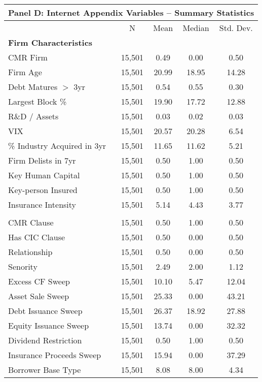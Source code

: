 {
\def\sym#1{\ifmmode^{#1}\else\(^{#1}\)\fi}
\begin{tabular}{l*{1}{cccc}}
\toprule
\multicolumn{5}{c}{\small \centering \textbf{Panel D}: Internet Appendix Variables -- Summary Statistics}\\ \midrule                    &           N&        Mean&      Median&   Std. Dev.\\
\midrule
\multicolumn{5}{l}{\textbf{Firm Characteristics}} \\ CMR Firm            &      15,501&        0.49&        0.00&        0.50\\
Firm Age            &      15,501&       20.99&       18.95&       14.28\\
Debt Matures $ > $ 3yr&      15,501&        0.54&        0.55&        0.30\\
Largest Block \%    &      15,501&       19.90&       17.72&       12.88\\
R\&D / Assets       &      15,501&        0.03&        0.02&        0.03\\
VIX                 &      15,501&       20.57&       20.28&        6.54\\
\% Industry Acquired in 3yr&      15,501&       11.65&       11.62&        5.21\\
Firm Delists in 7yr &      15,501&        0.50&        1.00&        0.50\\
Key Human Capital   &      15,501&        0.50&        1.00&        0.50\\
Key-person Insured  &      15,501&        0.50&        1.00&        0.50\\
Insurance Intensity &      15,501&        5.14&        4.43&        3.77\\
\addlinespace \multicolumn{5}{l}{\textbf{Loan Characteristics}} \\ CMR Clause          &      15,501&        0.50&        1.00&        0.50\\
Has CIC Clause      &      15,501&        0.50&        0.00&        0.50\\
Relationship        &      15,501&        0.50&        0.00&        0.50\\
Senority            &      15,501&        2.49&        2.00&        1.12\\
Excess CF Sweep     &      15,501&       10.10&        5.47&       12.04\\
Asset Sale Sweep    &      15,501&       25.33&        0.00&       43.21\\
Debt Issuance Sweep &      15,501&       26.37&       18.92&       27.88\\
Equity Issuance Sweep&      15,501&       13.74&        0.00&       32.32\\
Dividend Restriction&      15,501&        0.50&        1.00&        0.50\\
Insurance Proceeds Sweep&      15,501&       15.94&        0.00&       37.29\\
Borrower Base Type  &      15,501&        8.08&        8.00&        4.34\\
\bottomrule
\end{tabular}
}
